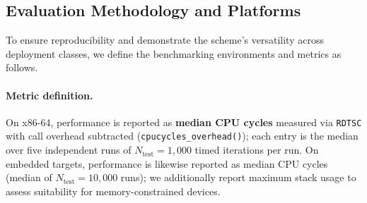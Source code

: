 \subsection{Evaluation Methodology and Platforms}
\label{sec:eval-methodology}

To ensure reproducibility and demonstrate the scheme's versatility across
deployment classes, we define the benchmarking environments and metrics as
follows.

\paragraph{Metric definition.}
On x86-64, performance is reported as \textbf{median CPU cycles} measured via
\texttt{RDTSC} with call overhead subtracted
(\texttt{cpucycles\_overhead()}); each entry is the median over five
independent runs of $N_{\mathrm{test}}{=}1{,}000$ timed iterations per run.
On embedded targets, performance is likewise reported as median CPU cycles
(median of $N_{\mathrm{test}}{=}10{,}000$ runs); we additionally report
maximum stack usage to assess suitability for memory-constrained devices.

